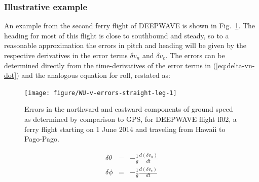 \documentclass[12pt,twoside,english]{article}\usepackage[]{graphicx}\usepackage[]{color}
\newenvironment{knitrout}{}{} %
\let\OrgIndex\index
\renewcommand*{\index}[1]{\OrgIndex{#1}}
\begin{document}
\subsubsection{Illustrative example}

An example from the second ferry flight of DEEPWAVE is shown in Fig.~\ref{fig:v-errors-straight-leg}. The heading for most of this flight is close to southbound and steady, so to a reasonable approximation the errors in pitch and heading will be given by the respective derivatives in the error terms $\delta v_{n}$ and $\delta v_{e}$. 
The errors can be determined directly from the time-derivatives of the error terms in (\ref{eq:delta-vn-dot}) and the analogous equation for roll, restated as: 

\begin{knitrout}\footnotesize
{}\color{fgcolor}\begin{figure}

{\centering \texttt{[image: figure/WU-v-errors-straight-leg-1]} 

}

\caption[Errors in the northward and eastward components of ground speed as determined by comparison to GPS, for DEEPWAVE flight ff02, a ferry flight starting on 1 June 2014 and traveling from Hawaii to Pago-Pago]{Errors in the northward and eastward components of ground speed as determined by comparison to GPS, for DEEPWAVE flight ff02, a ferry flight starting on 1 June 2014 and traveling from Hawaii to Pago-Pago.}\label{fig:v-errors-straight-leg}
\end{figure}


\end{knitrout}


\begin{eqnarray}
\delta\theta & = & -\frac{1}{g}\frac{d(\delta v_{n})}{dt}\label{eq:delta-theta}\\ 
\delta\phi & = & -\frac{1}{g}\frac{d(\delta v_{e})}{dt}\label{eq:delta-phi} 
\end{eqnarray}
\end{document}
